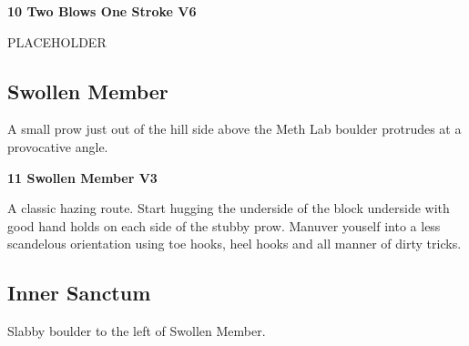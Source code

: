 \begin{multicols}{2}
					\begin{minipage}{\linewidth}	
					\label{rt:Two Blows One Stroke}\colorbox{RoyalBlue!20}{\textbf{10 Two Blows One Stroke V6  }}
					\begin{adjustwidth}{0.5cm}{}				
					PLACEHOLDER
					\end{adjustwidth}
					\end{minipage}
			\subsection*{Swollen Member}\label{bf:Swollen Member}
			\begin{minipage}{\columnwidth}
			A small prow just out of the hill side above the Meth Lab boulder protrudes at a provocative angle.
			\end{minipage}
			
					\begin{minipage}{\linewidth}	
					\label{rt:Swollen Member}\colorbox{green!20}{\textbf{11 Swollen Member V3 \ding{72}   }}
					\begin{adjustwidth}{0.5cm}{}				
					A classic hazing route. Start hugging the underside of the block underside with good hand holds on each side of the stubby prow. Manuver youself into a less scandelous orientation using toe hooks, heel hooks and  all manner of dirty tricks.
					\end{adjustwidth}
					\end{minipage}
			\subsection*{Inner Sanctum}\label{bf:Inner Sanctum}
			\begin{minipage}{\columnwidth}
			Slabby boulder to the left of Swollen Member.
			\end{minipage}
			


\end{multicols}

